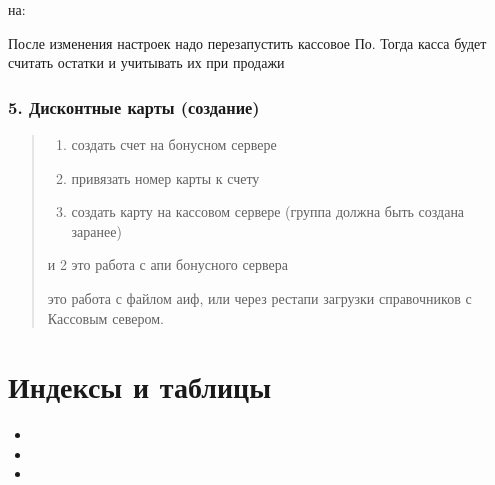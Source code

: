 \documentclass[letterpaper,10pt,russian]{sphinxmanual}
\begin{document}
\begin{sphinxVerbatim}[commandchars=\\\{\}]
  
  
\end{sphinxVerbatim}

\sphinxAtStartPar
на:

\begin{sphinxVerbatim}[commandchars=\\\{\}]
  
  
\end{sphinxVerbatim}

\sphinxAtStartPar
После изменения настроек надо перезапустить кассовое По.
Тогда касса будет считать остатки и учитывать их при продажи


\subsection{5. Дисконтные карты (создание)}
\label{\detokenize{additional:id5}}\begin{quote}
\begin{enumerate}
%
\item {} 
\sphinxAtStartPar
создать счет на бонусном сервере

\item {} 
\sphinxAtStartPar
привязать номер карты к счету

\item {} 
\sphinxAtStartPar
создать карту на кассовом сервере (группа должна быть создана заранее)

\end{enumerate}

 и 2 это работа с апи бонусного сервера

 это работа с файлом аиф, или через рестапи загрузки справочников с Кассовым севером.

\sphinxAtStartPar
{}
\end{quote}


\chapter{Индексы и таблицы}
\label{\detokenize{index:id1}}\begin{itemize}
\item {} 
\sphinxAtStartPar
{}

\item {} 
\sphinxAtStartPar
{}

\item {} 
\sphinxAtStartPar
{}

\end{itemize}
\end{document}
